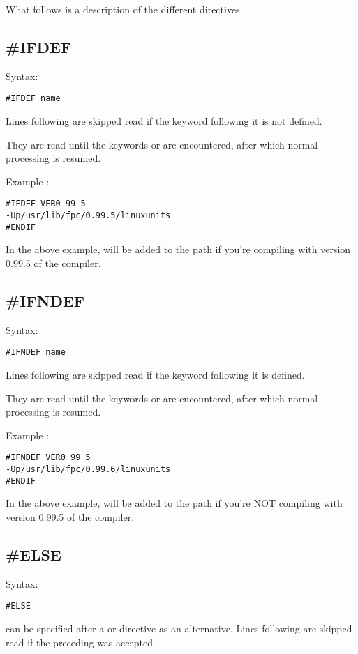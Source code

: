 \documentclass{report}
\begin{document}
What follows is a description of the different directives.

\subsection{\#IFDEF}
Syntax:
\begin{verbatim}
#IFDEF name
\end{verbatim} 
Lines following  are skipped read if the keyword 
following it is not defined.

They are read until the keywords  or  are
encountered, after which normal processing is resumed.

Example :
\begin{verbatim}
#IFDEF VER0_99_5
-Up/usr/lib/fpc/0.99.5/linuxunits
#ENDIF
\end{verbatim}
In the above example,  will be added to
the path if you're compiling with version 0.99.5 of the compiler.

\subsection{\#IFNDEF}
Syntax:
\begin{verbatim}
#IFNDEF name
\end{verbatim} 
Lines following  are skipped read if the keyword 
following it is defined.

They are read until the keywords  or  are
encountered, after which normal processing is resumed.

Example :
\begin{verbatim}
#IFNDEF VER0_99_5
-Up/usr/lib/fpc/0.99.6/linuxunits
#ENDIF
\end{verbatim}
In the above example,  will be added to
the path if you're NOT compiling with version 0.99.5 of the compiler.

\subsection{\#ELSE}
Syntax:
\begin{verbatim}
#ELSE
\end{verbatim} 
 can be specified after a  or 
directive as an alternative.
Lines following  are skipped read if the preceding 
 was accepted.
\end{document}

